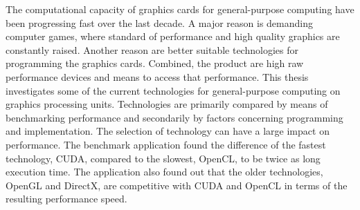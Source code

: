 The computational capacity of graphics cards for general-purpose computing have been progressing fast over the last decade. A major reason is demanding computer games, where standard of performance and high quality graphics are constantly raised. Another reason are better suitable technologies for programming the graphics cards. Combined, the product are high raw performance devices and means to access that performance. This thesis investigates some of the current technologies for general-purpose computing on graphics processing units. Technologies are primarily compared by means of benchmarking performance and secondarily by factors concerning programming and implementation. The selection of technology can have a large impact on performance. The benchmark application found the difference of the fastest technology, CUDA, compared to the slowest, OpenCL, to be twice as long execution time. The application also found out that the older technologies, OpenGL and DirectX, are competitive with CUDA and OpenCL in terms of the resulting performance speed.%